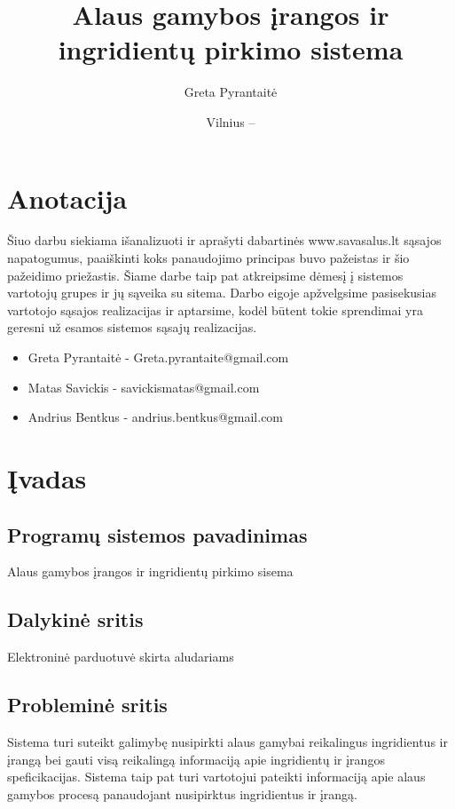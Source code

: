 \documentclass[oneside]{VUMIFPSkursinis}
\title{Alaus gamybos įrangos ir ingridientų pirkimo sistema}
\author{Greta Pyrantaitė}
\date{Vilnius – \the\year}
\begin{document}
\maketitle

\section{Anotacija}
Šiuo darbu siekiama išanalizuoti ir aprašyti dabartinės www.savasalus.lt sąsajos napatogumus, paaiškinti koks panaudojimo principas buvo pažeistas ir šio pažeidimo priežastis.
Šiame darbe taip pat atkreipsime dėmesį į sistemos vartotojų grupes ir jų sąveika su sitema.
Darbo eigoje apžvelgsime pasisekusias vartotojo sąsajos realizacijas ir aptarsime, kodėl būtent tokie sprendimai yra geresni už esamos sistemos sąsajų realizacijas.

\begin{itemize}
	\item{Greta Pyrantaitė - Greta.pyrantaite@gmail.com}
	\item{Matas Savickis - savickismatas@gmail.com}
	\item{Andrius Bentkus - andrius.bentkus@gmail.com}
\end{itemize}

\tableofcontents

\section{Įvadas}
	\subsection{Programų sistemos pavadinimas}
		Alaus gamybos įrangos ir ingridientų pirkimo sisema
	\subsection{Dalykinė sritis}
		Elektroninė parduotuvė skirta aludariams
	\subsection{Probleminė sritis}
		Sistema turi suteikt galimybę nusipirkti alaus gamybai reikalingus ingridientus ir įrangą bei gauti visą reikalingą informaciją apie ingridientų ir įrangos speficikacijas.
		Sistema taip pat turi vartotojui pateikti informaciją apie alaus gamybos procesą panaudojant nusipirktus ingridientus ir įrangą.
\end{document}
